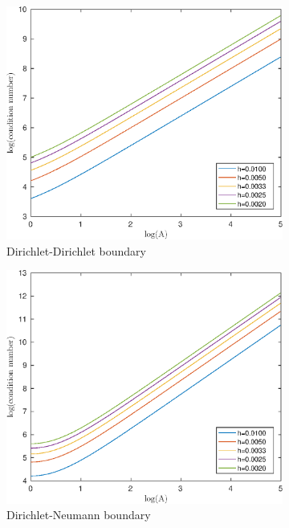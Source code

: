 \documentclass[12pt]{article}
\begin{document}
\begin{figure}[h!]
\centering
\begin{subfigure}{0.4\textwidth}
\includegraphics[width=\textwidth]{cond-A-42-DD}
\caption{Dirichlet-Dirichlet boundary}
\end{subfigure}
\hfill
\begin{subfigure}{0.4\textwidth}
\includegraphics[width=\textwidth]{cond-A-42-DN}
\caption{Dirichlet-Neumann boundary}
\end{subfigure}
\vfill
\begin{subfigure}{0.4\textwidth}

\end{subfigure}
\end{figure}
\end{document}
